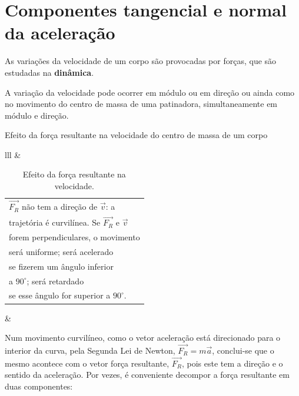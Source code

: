 \documentclass[a4paper,11pt,oneside]{report}
\begin{document}
\chapter{Componentes tangencial e normal da aceleração}
\label{chap.componemtes}

As variações da velocidade de um corpo são provocadas por forças, 
que são estudadas na \textbf{dinâmica}.

A variação da velocidade pode ocorrer em módulo ou em direção ou
 ainda como no movimento do centro de massa de uma patinadora, 
 simultaneamente em módulo e direção.

\noindent \hrulefill
\begin{center}
    Efeito da força resultante na velocidade do centro de massa de um corpo
\end{center}
\begin{table}[h]
    \centering
    \begin{tabular}{lll}
     & \begin{tabular}[c]{@{}l@{}}$\overrightarrow{F_R}$ não tem a direção de $\vec v$: a \\ trajetória é curvilínea. Se $\overrightarrow{F_R}$ e $\vec v$ \\ forem perpendiculares, o movimento \\ será uniforme; será acelerado \\ se fizerem um ângulo inferior \\ a $90^\circ$; será retardado \\ se esse ângulo for superior a $90^\circ$.\end{tabular} &  \\
    \end{tabular}
    \caption{Efeito da força resultante na velocidade.}
    \label{tab:tabela3}
\end{table}
\hrulefill

Num movimento curvilíneo, como o vetor aceleração está direcionado para
o interior da curva, pela Segunda Lei de Newton, $\overrightarrow{F_R}=m\vec a$, 
conclui-se que o mesmo acontece com o vetor força resultante, $\overrightarrow{F_R}$,
pois este tem a direção e o sentido da aceleração. Por vezes, é conveniente 
decompor a força resultante em duas componentes:
\end{document}
